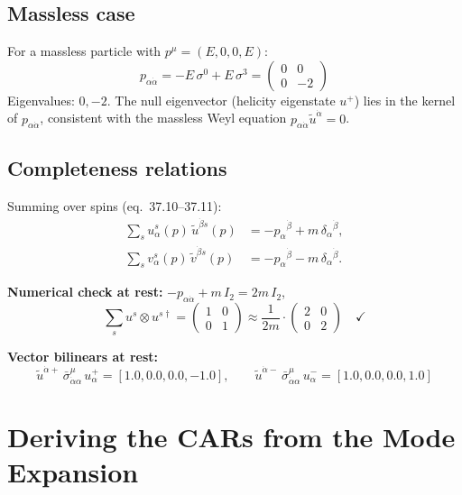 \documentclass[12pt]{article}
\begin{document}
\subsection{Massless case}

For a massless particle with $p^\mu = (E,0,0,E)$:
\[
  p_{\alpha\dot\alpha}
  = -E\,\sigma^0 + E\,\sigma^3
  = \begin{pmatrix}0 & 0 \\ 0 & -2\end{pmatrix}
\]
Eigenvalues: $0, -2$.
The null eigenvector (helicity eigenstate $u^+$) lies in the kernel of
$p_{\alpha\dot\alpha}$, consistent with the massless Weyl equation
$p_{\alpha\dot\alpha}\tilde u^{\dot\alpha} = 0$.

\subsection{Completeness relations}

Summing over spins (eq.~37.10--37.11):
\begin{align}
  \sum_s u^s_\alpha(p)\,\tilde u^{\dot\beta s}(p) &= -p_{\alpha}{}^{\dot\beta} + m\,\delta_\alpha{}^{\dot\beta},
  \tag{37.10}\\
  \sum_s v^s_\alpha(p)\,\tilde v^{\dot\beta s}(p) &= -p_{\alpha}{}^{\dot\beta} - m\,\delta_\alpha{}^{\dot\beta}.
  \tag{37.11}
\end{align}

\textbf{Numerical check at rest:} $-p_{\alpha\dot\alpha} + m\,I_2 = 2m\,I_2$,
\[
  \sum_s u^s\otimes u^{s\dagger} = \begin{pmatrix}1 & 0 \\ 0 & 1\end{pmatrix}
  \approx \frac{1}{2m}\cdot \begin{pmatrix}2 & 0 \\ 0 & 2\end{pmatrix} \quad\checkmark
\]

\textbf{Vector bilinears at rest:}
\[
  \tilde u^{\dot\alpha +}\,\bar\sigma^\mu_{\dot\alpha\alpha}\,u^+_\alpha
  = [1.0, 0.0, 0.0, -1.0],\qquad
  \tilde u^{\dot\alpha -}\,\bar\sigma^\mu_{\dot\alpha\alpha}\,u^-_\alpha
  = [1.0, 0.0, 0.0, 1.0]
\]

\section{Deriving the CARs from the Mode Expansion}
\end{document}
